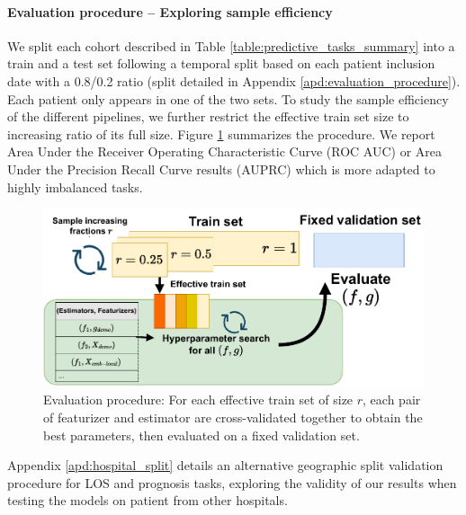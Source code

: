 \documentclass[french,12pt,twoside,a4paper]{book}
\begin{document}
\paragraph{Evaluation procedure -- Exploring sample efficiency}%
\label{par:predictive_models:evaluation_pipeline}

We split each cohort described in Table \ref{table:predictive_tasks_summary}
into a train and a test set following a temporal split based on each patient
inclusion date with a 0.8/0.2 ratio (split detailed in Appendix
\ref{apd:evaluation_procedure}). Each patient only appears in one of the two
sets. To study the sample efficiency of the different pipelines, we further
restrict the effective train set size to increasing ratio of its full size.
Figure \ref{fig:evaluation_procedure} summarizes the procedure. We report Area
Under the Receiver Operating Characteristic Curve (ROC AUC) or Area Under the
Precision Recall Curve results (AUPRC) which is more adapted to highly
imbalanced tasks.

\begin{figure}[!h]
  \centering
  \includegraphics[width=0.8\linewidth]{img/chapter_3/selection_procedure.pdf}
  \caption{Evaluation procedure: For
    each effective train set of size $r$, each pair of featurizer and estimator
    are cross-validated together to obtain the best parameters, then evaluated
    on a fixed validation set.}\label{fig:evaluation_procedure}
\end{figure}

Appendix \ref{apd:hospital_split} details an alternative geographic split
validation procedure for LOS and prognosis tasks, exploring the validity of our
results when testing the models on patient from other hospitals.
\end{document}
